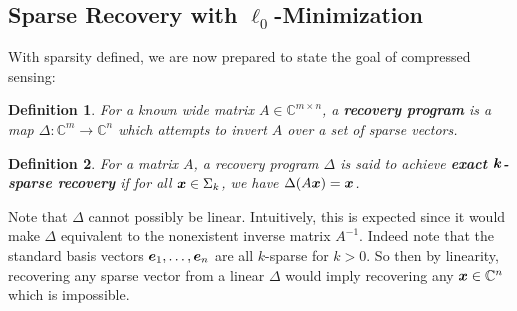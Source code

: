 \documentclass[twocolumn]{gwclass}
\newtheorem{definition}{Definition}
\newcommand{\C}{\mathbb{C}}
\begin{document}
	\subsection{Sparse Recovery with $\ell_0$-Minimization}
	With sparsity defined, we are now prepared to state the goal of compressed sensing:
	\begin{definition}
		For a known wide matrix $A\in\C^{m\times n}$, a \textbf{recovery program} is a map $\Delta:\C^m\to\C^n$ which attempts to invert $A$ over a set of sparse vectors.
	\end{definition}
	\begin{definition}
		For a matrix $A$, a recovery program $\Delta$ is said to achieve \textbf{exact $\boldsymbol{k}$-sparse recovery} if for all $\boldsymbol{x}\in\Sigma_k$, we have $\Delta(A\boldsymbol{x})=\boldsymbol{x}$.
	\end{definition}
	Note that $\Delta$ cannot possibly be linear. Intuitively, this is expected since it would make $\Delta$ equivalent to the nonexistent inverse matrix $A^{-1}$. Indeed note that the standard basis vectors $\boldsymbol{e}_1,\dots,\boldsymbol{e}_n$ are all $k$-sparse for $k>0$. So then by linearity, recovering any sparse vector from a linear $\Delta$ would imply recovering any $\*x\in\C^n$ which is impossible.
	
\end{document}
